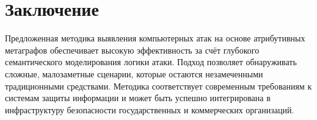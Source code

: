 \section{Заключение}

Предложенная методика выявления компьютерных атак на основе атрибутивных метаграфов обеспечивает высокую эффективность за счёт глубокого семантического моделирования логики атаки. Подход позволяет обнаруживать сложные, малозаметные сценарии, которые остаются незамеченными традиционными средствами. Методика соответствует современным требованиям к системам защиты информации и может быть успешно интегрирована в инфраструктуру безопасности государственных и коммерческих организаций.